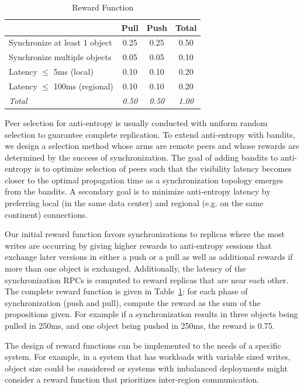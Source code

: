 \begin{table}[ht]
\centering
\begin{tabular}{@{}l c c c @{}}
\toprule
& \textbf{Pull} & \textbf{Push} & \textbf{Total} \\
\midrule
Synchronize at least 1 object & 0.25 & 0.25 & 0.50 \\
Synchronize multiple objects  & 0.05 & 0.05 & 0.10 \\
Latency $\leq$ 5ms (local)        & 0.10 & 0.10 & 0.20 \\
Latency $\leq$ 100ms (regional)   & 0.10 & 0.10 & 0.20 \\
\midrule
\textit{Total} & \textit{0.50} & \textit{0.50} & \textit{1.00} \\
\bottomrule
\end{tabular}
\caption{Reward Function}
\label{tab:rewards}
\end{table}

Peer selection for anti-entropy is usually conducted with uniform random
selection to guarantee complete replication.
To extend anti-entropy with bandits, we design a selection method whose arms
are remote peers and whose rewards are determined by the success of
synchronization.
The goal of adding bandits to anti-entropy is to optimize selection of peers
such that the visibility latency becomes closer to the optimal propagation
time as a synchronization topology emerges from the bandits.
A secondary goal is to minimize anti-entropy latency by preferring local (in
the same data center) and regional (e.g. on the same continent) connections.

Our initial reward function favors synchronizations to replicas where the
most writes are occurring by giving higher rewards to anti-entropy sessions
that exchange later versions in either a push or a pull as well as additional
rewards if more than one object is exchanged.
Additionally, the latency of the synchronization RPCs is computed to reward
replicas that are near each other.
The complete reward function is given in Table~\ref{tab:rewards}: for each
phase of synchronization (push and pull), compute the reward as the sum of the
propositions given.
For example if a synchronization results in three objects being pulled in
250ms, and one object being pushed in 250ms, the reward is 0.75.

The design of reward functions can be implemented to the needs of a specific
system.
For example, in a system that has workloads with variable sized writes, object
size could be considered or systems with imbalanced deployments might
consider a reward function that prioritizes inter-region communication.

